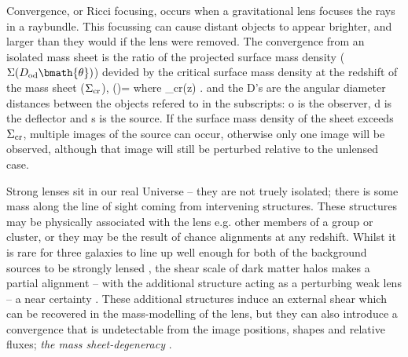 \documentclass[useAMS,usenatbib]{mn2e}
\begin{document}
Convergence, or Ricci focusing, occurs when a gravitational lens focuses the rays in a raybundle.
This focussing can cause distant objects to appear brighter, and larger than they would if the lens
 were removed.
The convergence from an isolated mass sheet is the ratio of the projected surface mass density
($\Sigma(D_{\mathrm{od}}\bmath{\theta})$) devided by the critical surface mass density at the redshift of the mass sheet ($\Sigma_{\rm cr}$),
\be
\kappa(\bmath{\theta})= 
\ee
where 
\be \label{eq:sigcrit} 
\Sigma_{\rm cr}(z) \equiv {}.
\ee
and the D's are the angular diameter distances between the objects refered to in the subscripts: o is the observer, d is the deflector and s is the source. If the surface mass density of the sheet exceeds $\Sigma_{\rm cr}$, multiple images of the source can
occur, otherwise only one image will be observed, although that image will still be perturbed
relative to the unlensed case.


Strong lenses sit in our real Universe -- they are not truely isolated;
there is some mass along the line of sight coming from intervening structures.
These structures may be physically associated with the lens e.g. other members
of a group or cluster, or they may be the result of chance alignments at any redshift. 
Whilst it is rare for three galaxies to line up well enough for both of the background sources
to be strongly lensed \citep{GavazziEtal2008,CollettEtal2012a}, the shear scale of dark matter halos
makes a partial alignment -- with the additional structure acting as a perturbing weak lens -- 
a near certainty \citep{Vale+White2003,HilbertEtal2007}. These additional
structures induce an external shear which can be recovered in the mass-modelling
of the lens, but they can also introduce a convergence that
is undetectable from the image positions, shapes and relative fluxes; {\it the
mass sheet-degeneracy} \citep{FalcoEtal1985}.
\end{document}
